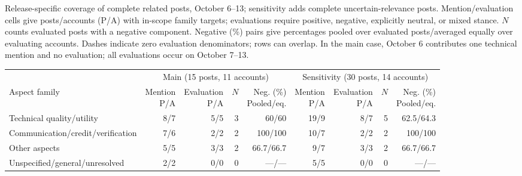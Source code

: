 \caption{Release-specific coverage of complete related posts, October 6--13; sensitivity adds complete uncertain-relevance posts. Mention/evaluation cells give posts/accounts (P/A) with in-scope family targets; evaluations require positive, negative, explicitly neutral, or mixed stance. $N$ counts evaluated posts with a negative component. Negative (\%) pairs give percentages pooled over evaluated posts/averaged equally over evaluating accounts. Dashes indicate zero evaluation denominators; rows can overlap. In the main case, October 6 contributes one technical mention and no evaluation; all evaluations occur on October 7--13.}
\label{tab:event}
\centering
\begin{tabular*}{\textwidth}{@{\extracolsep{\fill}}lrrrrrrrr@{}}
\toprule
& \multicolumn{4}{c}{Main (15 posts, 11 accounts)} & \multicolumn{4}{c}{Sensitivity (30 posts, 14 accounts)}\\
\cmidrule(lr){2-5}\cmidrule(lr){6-9}
Aspect family & \shortstack{Mention\\P/A} & \shortstack{Evaluation\\P/A} & $N$ & \shortstack{Neg. (\%)\\Pooled/eq.} & \shortstack{Mention\\P/A} & \shortstack{Evaluation\\P/A} & $N$ & \shortstack{Neg. (\%)\\Pooled/eq.}\\
\midrule
Technical quality/utility & 8/7 & 5/5 & 3 & 60/60 & 19/9 & 8/7 & 5 & 62.5/64.3\\
Communication/credit/verification & 7/6 & 2/2 & 2 & 100/100 & 10/7 & 2/2 & 2 & 100/100\\
Other aspects & 5/5 & 3/3 & 2 & 66.7/66.7 & 9/7 & 3/3 & 2 & 66.7/66.7\\
Unspecified/general/unresolved & 2/2 & 0/0 & 0 & ---/--- & 5/5 & 0/0 & 0 & ---/---\\
\bottomrule
\end{tabular*}
